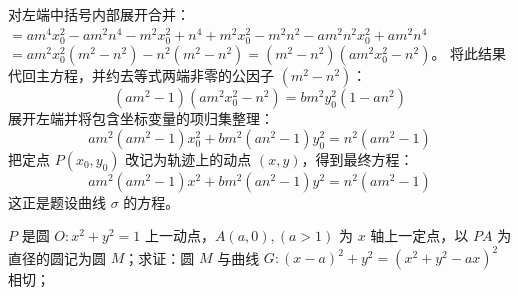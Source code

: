 \begin{solution}
对左端中括号内部展开合并：
$= a m^4 x_0^2 - a m^2 n^4 - m^2 x_0^2 + n^4 + m^2 x_0^2 - m^2 n^2 - a m^2 n^2 x_0^2 + a m^2 n^4$
$= a m^2 x_0^2 (m^2 - n^2) - n^2 (m^2 - n^2) = (m^2 - n^2) (a m^2 x_0^2 - n^2)$。
将此结果代回主方程，并约去等式两端非零的公因子 $(m^2 - n^2)$：
$$ (a m^2 - 1) (a m^2 x_0^2 - n^2) = b m^2 y_0^2 (1 - a n^2) $$
展开左端并将包含坐标变量的项归集整理：
$$ a m^2 (a m^2 - 1) x_0^2 + b m^2 (a n^2 - 1) y_0^2 = n^2 (a m^2 - 1) $$
把定点 $P(x_0, y_0)$ 改记为轨迹上的动点 $(x,y)$，得到最终方程：
$$ a m^2 (a m^2 - 1) x^2 + b m^2 (a n^2 - 1) y^2 = n^2 (a m^2 - 1) $$
这正是题设曲线 $\sigma$ 的方程。
\end{solution}


\begin{example}
 $P$ 是圆 $O: x^2 + y^2 = 1$ 上一动点，$A(a,0),(a>1)$ 为 $x$ 轴上一定点，以 $PA$ 为直径的圆记为圆 $M$；求证：圆 $M$ 与曲线 $G: (x-a)^2 + y^2 = (x^2 + y^2 - ax)^2$ 相切；
\end{example}
